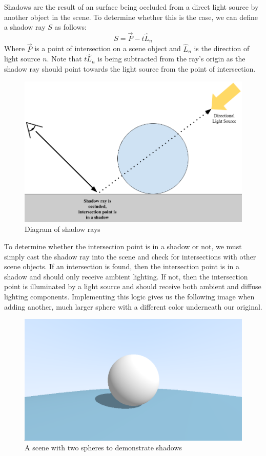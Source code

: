 Shadows are the result of an surface being occluded from a direct light source by another object in the scene. To determine whether this is the case, we can define a shadow ray $S$ as follows:
$$S = \Vec{P} - t\hat{L}_n$$
Where $\Vec{P}$ is a point of intersection on a scene object and $\hat{L}_n$ is the direction of light source $n$. Note that $t\hat{L}_n$ is being subtracted from the ray's origin as the shadow ray should point towards the light source from the point of intersection.
\begin{figure}[H]
    \centering
    \includegraphics[scale=0.4]{figures/Shadows.png}
    \caption{Diagram of shadow rays}
    \label{fig:shadow_diag}
\end{figure}
\noindent
To determine whether the intersection point is in a shadow or not, we must simply cast the shadow ray into the scene and check for intersections with other scene objects. If an intersection is found, then the intersection point is in a shadow and should only receive ambient lighting. If not, then the intersection point is illuminated by a light source and should receive both ambient and diffuse lighting components. Implementing this logic gives us the following image when adding another, much larger sphere with a different color underneath our original.
\begin{figure}[H]
    \centering
    \includegraphics[scale=0.5]{figures/SphereShadows.png}
    \caption{A scene with two spheres to demonstrate shadows}
    \label{fig:sphere_shadows}
\end{figure}
